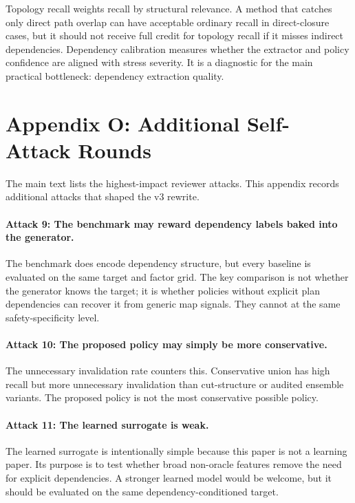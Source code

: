 \documentclass{article}
\begin{document}
Topology recall weights recall by structural relevance. A method that catches only direct path overlap can have acceptable ordinary recall in direct-closure cases, but it should not receive full credit for topology recall if it misses indirect dependencies. Dependency calibration measures whether the extractor and policy confidence are aligned with stress severity. It is a diagnostic for the main practical bottleneck: dependency extraction quality.

\section{Appendix O: Additional Self-Attack Rounds}

The main text lists the highest-impact reviewer attacks. This appendix records additional attacks that shaped the v3 rewrite.

\paragraph{Attack 9: The benchmark may reward dependency labels baked into the generator.}
The benchmark does encode dependency structure, but every baseline is evaluated on the same target and factor grid. The key comparison is not whether the generator knows the target; it is whether policies without explicit plan dependencies can recover it from generic map signals. They cannot at the same safety-specificity level.

\paragraph{Attack 10: The proposed policy may simply be more conservative.}
The unnecessary invalidation rate counters this. Conservative union has high recall but more unnecessary invalidation than cut-structure or audited ensemble variants. The proposed policy is not the most conservative possible policy.

\paragraph{Attack 11: The learned surrogate is weak.}
The learned surrogate is intentionally simple because this paper is not a learning paper. Its purpose is to test whether broad non-oracle features remove the need for explicit dependencies. A stronger learned model would be welcome, but it should be evaluated on the same dependency-conditioned target.
\end{document}
